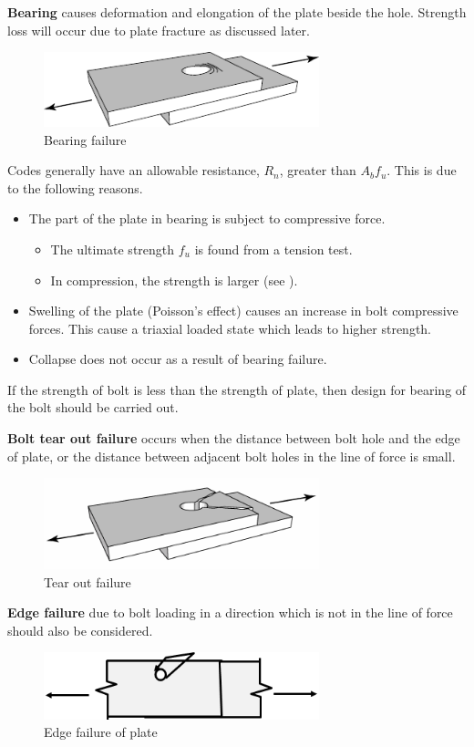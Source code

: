 \textbf{Bearing} causes deformation and elongation of the plate beside the hole. Strength loss will occur due to plate fracture as discussed later.
\begin{figure}[H]
\centering
\includegraphics[width=8cm]{PIC/CH06/BBEAR}\caption{Bearing failure}
\end{figure}

Codes generally have an allowable resistance, $R_n$, greater than $A_bf_u$. This is due to the following reasons.
\begin{itemize}
\item The part of the plate in bearing is subject to compressive force.
\begin{itemize}
\item The ultimate strength $f_u$ is found from a tension test.
\item In compression, the strength is larger (see ).
\end{itemize}
\item Swelling of the plate (Poisson's effect) causes an increase in bolt compressive forces. This cause a triaxial loaded state which leads to higher strength.
\item Collapse does not occur as a result of bearing failure.
\end{itemize}

If the strength of bolt is less than the strength of plate, then design for bearing of the bolt should be carried out.

\textbf{Bolt tear out failure} occurs when the distance between bolt hole and the edge of plate, or the distance between adjacent bolt holes in the line of force is small.
\begin{figure}[H]
\centering
\includegraphics[width=8cm]{PIC/CH06/BTEAR}\caption{Tear out failure}
\end{figure}

\textbf{Edge failure} due to bolt loading in a direction which is not in the line of force should also be considered.
\begin{figure}[H]
\centering
\includegraphics[width=8cm]{PIC/CH06/SF}\caption{Edge failure of plate}
\end{figure}

